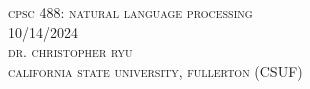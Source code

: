 \documentclass[twocolumn,10pt]{article}
\begin{document}
\onecolumn
\\~\\

\textsc{cpsc 488: natural language processing}\\
\textsc{10/14/2024}\\
\textsc{dr. christopher ryu}\\
\textsc{california state university, fullerton (CSUF)}\\~\\
\end{document}
